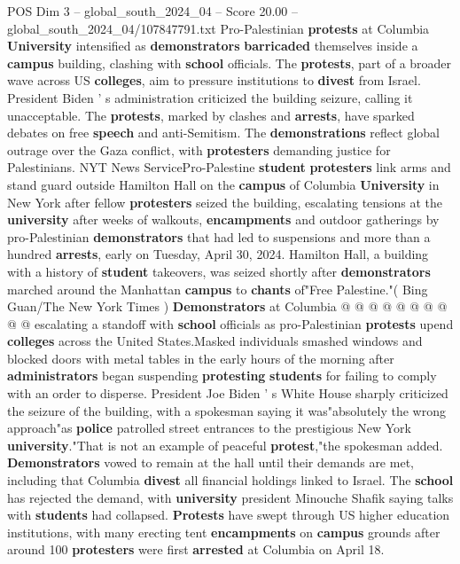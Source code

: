 \begin{textsample}{POS Dim 3 – global\_south\_2024\_04 – Score 20.00 – global\_south\_2024\_04/107847791.txt}  \label{ex:f3_pos_191}
Pro-Palestinian \textbf{protests} at Columbia \textbf{University} intensified as \textbf{demonstrators} \textbf{barricaded} themselves inside a \textbf{campus} building, clashing with \textbf{school} officials.
The \textbf{protests}, part of a broader wave across US \textbf{colleges}, aim to pressure institutions to \textbf{divest} from Israel.
President Biden ' s administration criticized the building seizure, calling it unacceptable.
The \textbf{protests}, marked by clashes and \textbf{arrests}, have sparked debates on free \textbf{speech} and anti-Semitism.
The \textbf{demonstrations} reflect global outrage over the Gaza conflict, with \textbf{protesters} demanding justice for Palestinians.
NYT News ServicePro-Palestine \textbf{student} \textbf{protesters} link arms and stand guard outside Hamilton Hall on the \textbf{campus} of Columbia \textbf{University} in New York after fellow \textbf{protesters} seized the building, escalating tensions at the \textbf{university} after weeks of walkouts, \textbf{encampments} and outdoor gatherings by pro-Palestinian \textbf{demonstrators} that had led to suspensions and more than a hundred \textbf{arrests}, early on Tuesday, April 30, 2024.
Hamilton Hall, a building with a history of \textbf{student} takeovers, was seized shortly after \textbf{demonstrators} marched around the Manhattan \textbf{campus} to \textbf{chants} of"Free Palestine."( Bing Guan/The New York Times ) \textbf{Demonstrators} at Columbia @ @ @ @ @ @ @ @ @ @ escalating a standoff with \textbf{school} officials as pro-Palestinian \textbf{protests} upend \textbf{colleges} across the United States.Masked individuals smashed windows and blocked doors with metal tables in the early hours of the morning after \textbf{administrators} began suspending \textbf{protesting} \textbf{students} for failing to comply with an order to disperse.
President Joe Biden ' s White House sharply criticized the seizure of the building, with a spokesman saying it was"absolutely the wrong approach"as \textbf{police} patrolled street entrances to the prestigious New York \textbf{university}."That is not an example of peaceful \textbf{protest},"the spokesman added. \textbf{Demonstrators} vowed to remain at the hall until their demands are met, including that Columbia \textbf{divest} all financial holdings linked to Israel.
The \textbf{school} has rejected the demand, with \textbf{university} president Minouche Shafik saying talks with \textbf{students} had collapsed. \textbf{Protests} have swept through US higher education institutions, with many erecting tent \textbf{encampments} on \textbf{campus} grounds after around 100 \textbf{protesters} were first \textbf{arrested} at Columbia on April 18.

\end{textsample}
